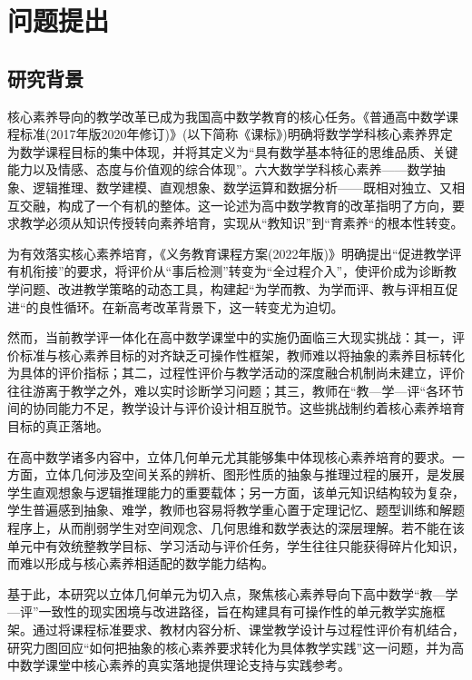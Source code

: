 \documentclass[UTF8,a4paper,12pt,twoside]{ctexart}
\begin{document}
\newpage %
\pagestyle{empty}
{\centering\tableofcontents}
\newpage %

\newpage
\section{问题提出}
\subsection{研究背景}
核心素养导向的教学改革已成为我国高中数学教育的核心任务。《普通高中数学课程标准(2017年版2020年修订)》(以下简称《课标》)明确将数学学科核心素养界定为数学课程目标的集中体现，并将其定义为“具有数学基本特征的思维品质、关键能力以及情感、态度与价值观的综合体现”。六大数学学科核心素养——数学抽象、逻辑推理、数学建模、直观想象、数学运算和数据分析——既相对独立、又相互交融，构成了一个有机的整体。这一论述为高中数学教育的改革指明了方向，要求教学必须从知识传授转向素养培育，实现从“教知识”到“育素养“的根本性转变。

为有效落实核心素养培育，《义务教育课程方案(2022年版)》明确提出“促进教学评有机衔接”的要求，将评价从“事后检测”转变为“全过程介入”，使评价成为诊断教学问题、改进教学策略的动态工具，构建起“为学而教、为学而评、教与评相互促进“的良性循环。在新高考改革背景下，这一转变尤为迫切。

然而，当前教学评一体化在高中数学课堂中的实施仍面临三大现实挑战：其一，评价标准与核心素养目标的对齐缺乏可操作性框架，教师难以将抽象的素养目标转化为具体的评价指标；其二，过程性评价与教学活动的深度融合机制尚未建立，评价往往游离于教学之外，难以实时诊断学习问题；其三，教师在“教—学—评“各环节间的协同能力不足，教学设计与评价设计相互脱节。这些挑战制约着核心素养培育目标的真正落地。

在高中数学诸多内容中，立体几何单元尤其能够集中体现核心素养培育的要求。一方面，立体几何涉及空间关系的辨析、图形性质的抽象与推理过程的展开，是发展学生直观想象与逻辑推理能力的重要载体；另一方面，该单元知识结构较为复杂，学生普遍感到抽象、难学，教师也容易将教学重心置于定理记忆、题型训练和解题程序上，从而削弱学生对空间观念、几何思维和数学表达的深层理解。若不能在该单元中有效统整教学目标、学习活动与评价任务，学生往往只能获得碎片化知识，而难以形成与核心素养相适配的数学能力结构。

基于此，本研究以立体几何单元为切入点，聚焦核心素养导向下高中数学“教—学—评”一致性的现实困境与改进路径，旨在构建具有可操作性的单元教学实施框架。通过将课程标准要求、教材内容分析、课堂教学设计与过程性评价有机结合，研究力图回应“如何把抽象的核心素养要求转化为具体教学实践”这一问题，并为高中数学课堂中核心素养的真实落地提供理论支持与实践参考。
\end{document}
